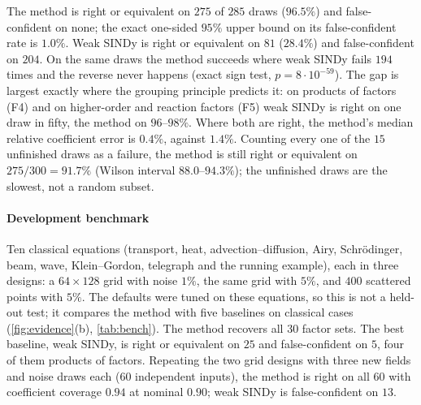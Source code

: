 The method is right or equivalent on $275$ of $285$ draws ($96.5\%$) and false-confident on none; the exact one-sided
$95\%$ upper bound on its false-confident rate is $1.0\%$. Weak SINDy is right or equivalent on $81$ ($28.4\%$) and
false-confident on $204$. On the same draws the method succeeds where weak SINDy fails $194$ times and the reverse never
happens (exact sign test, $p=8\cdot10^{-59}$). The gap is largest exactly where the grouping principle predicts it:
on products of factors (F4) and on higher-order and reaction factors (F5) weak SINDy is right on one draw in fifty,
the method on $96$--$98\%$. Where both are right, the method's median relative coefficient error is $0.4\%$, against
$1.4\%$. Counting every one of the $15$ unfinished draws as a failure, the method is still right or equivalent on
$275/300=91.7\%$ (Wilson interval $88.0$--$94.3\%$); the unfinished draws are the slowest, not a random subset.

\paragraph{Development benchmark} Ten classical equations (transport, heat, advection--diffusion, Airy, Schr\"odinger,
beam, wave, Klein--Gordon, telegraph and the running example), each in three designs: a $64\times128$ grid with noise $1\%$,
the same grid with $5\%$, and $400$ scattered points with $5\%$. The defaults were tuned on these equations, so this is not
a held-out test; it compares the method with five baselines on classical cases (\cref{fig:evidence}(b),
\cref{tab:bench}). The method recovers all $30$ factor sets. The best baseline, weak SINDy, is right or equivalent on $25$
and false-confident on $5$, four of them products of factors. Repeating the two grid designs with three new fields and
noise draws each ($60$ independent inputs), the method is right on all $60$ with coefficient coverage $0.94$ at nominal
$0.90$; weak SINDy is false-confident on $13$.

